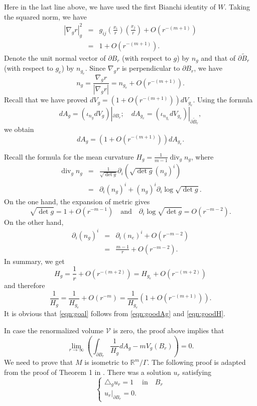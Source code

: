 \documentclass{amsart}
\newcommand{\abs}[1]{\left\vert#1\right\vert}
\newcommand{\Real}{\mathbb R}
\numberwithin{equation}{section}
\begin{document}
Here in the last line above, we have used the first Bianchi identity of $W$. 
Taking the squared norm, we have
\begin{eqnarray*}
	\abs{\nabla_g r}_g^2 &=& g_{ij} (\frac{x_i}{r})(\frac{x_j}{r}) +O(r^{-(m+1)})\\
			     &=& 1 + O(r^{-(m+1)}).
\end{eqnarray*}
Denote the unit normal vector of $\partial B_r$ (with respect to $g$) by $n_g$ and that of $\partial \tilde{B}_r$ (with respect to $g_e$) by $n_{g_e}$. Since $\nabla_g r$ is perpendicular to $\partial B_r$, we have
\begin{equation}
	\label{eqn:goodng}
	n_g = \frac{\nabla_g r}{ \abs{\nabla_g r}} = n_{g_e} + O(r^{-(m+1)}).
\end{equation}
Recall that we have proved $dV_g=(1+O(r^{-(m+1)}))dV_{g_e}$.
Using the formula
\[
	dA_g = (\iota_{n_g} dV_g)|_{\partial B_r}; \quad dA_{g_e}= (\iota_{n_{g_e}} dV_{g_e})|_{\partial \tilde B_r},
\]
we obtain
\begin{equation}
	\label{eqn:goodAg}
	dA_g= (1+ O(r^{-(m+1)}))dA_{g_e}.
\end{equation}

Recall the formula for the mean curvature $H_g= \frac{1}{m-1}\operatorname{div}_g n_g$, where
\begin{eqnarray*}
\operatorname{div}_g n_g&=&\frac{1}{\sqrt{\operatorname{det} g}} \partial_i\left(\sqrt{\operatorname{det} g}\left(n_g\right)^i\right)  \\
&=&\partial_i (n_g)^i + (n_g)^i \partial_i \log \sqrt{\det g}.
\end{eqnarray*}
On the one hand, the expansion of metric gives
$$
\sqrt{\det g}= 1+ O(r^{-m-1}) \quad \text{and} \quad \partial_i \log \sqrt{\det g} = O(r^{-m-2}).
$$
On the other hand,
\begin{eqnarray*}
	\partial_i(n_g)^i &=& \partial_i(n_e)^i + O(r^{-m-2}) \\
	&=& \frac{m-1}{r} + O(r^{-m-2}) .
\end{eqnarray*}
In summary, we get
\[
	H_g=\frac{1}{r}+ O(r^{-(m+2)})= H_{g_e}+ O(r^{-(m+2)})
\]
and therefore
\begin{equation}
	\label{eqn:goodH}
	\frac{1}{H_g}= \frac{1}{H_{g_e}}+ O(r^{-m})=\frac{1}{H_{g_e}}(1+O(r^{-(m+1)})).
\end{equation}
It is obvious that \eqref{eqn:goal} follows from \eqref{eqn:goodAg} and \eqref{eqn:goodH}. 

In case the renormalized volume $\mathcal V$ is zero, the proof above implies that
\begin{equation}
	\label{eqn:rigidity}
	\lim_{r\to \infty } \left( \int_{\partial B_r} \frac{1}{H_g} dA_g - m V_g(B_r) \right)=0.
\end{equation}
We need to prove that $M$ is isometric to $\Real^m/\Gamma$. The following proof is adapted from the proof of Theorem 1 in \cite{ros1987}. There was a solution $u_r$ satisfying
\[
	\begin{cases}
		\triangle_g u_r =1 & \text{in} \quad B_r \\
		u_r|_{\partial B_r} = 0.&
	\end{cases}
\]
\end{document}
